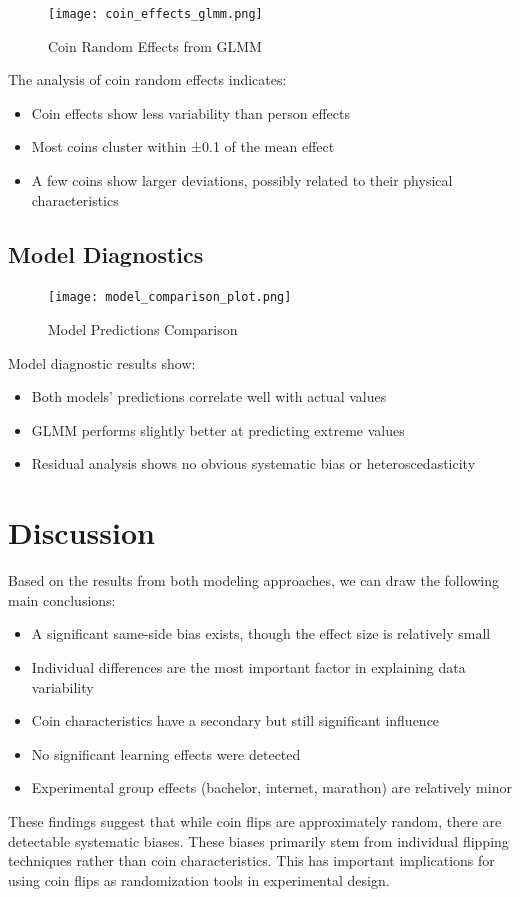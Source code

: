 \documentclass[12pt,a4paper]{article}
\begin{document}
\begin{figure}[h!]
    \centering
    \texttt{[image: coin\_effects\_glmm.png]}
    \caption{Coin Random Effects from GLMM}
    \label{fig:coin-effects}
\end{figure}

The analysis of coin random effects indicates:
\begin{itemize}
    \item Coin effects show less variability than person effects
    \item Most coins cluster within ±0.1 of the mean effect
    \item A few coins show larger deviations, possibly related to their physical characteristics
\end{itemize}

\subsection{Model Diagnostics}
\begin{figure}[h!]
    \centering
    \texttt{[image: model\_comparison\_plot.png]}
    \caption{Model Predictions Comparison}
    \label{fig:model-comparison}
\end{figure}

Model diagnostic results show:
\begin{itemize}
    \item Both models' predictions correlate well with actual values
    \item GLMM performs slightly better at predicting extreme values
    \item Residual analysis shows no obvious systematic bias or heteroscedasticity
\end{itemize}

\section{Discussion}
Based on the results from both modeling approaches, we can draw the following main conclusions:

\begin{itemize}
    \item A significant same-side bias exists, though the effect size is relatively small
    \item Individual differences are the most important factor in explaining data variability
    \item Coin characteristics have a secondary but still significant influence
    \item No significant learning effects were detected
    \item Experimental group effects (bachelor, internet, marathon) are relatively minor
\end{itemize}

These findings suggest that while coin flips are approximately random, there are detectable systematic biases. These biases primarily stem from individual flipping techniques rather than coin characteristics. This has important implications for using coin flips as randomization tools in experimental design.



\end{document}
